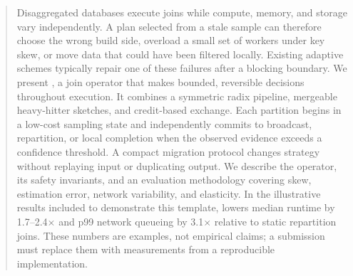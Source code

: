 \begin{abstract}
Disaggregated databases execute joins while compute, memory, and storage vary
independently.  A plan selected from a stale sample can therefore choose the
wrong build side, overload a small set of workers under key skew, or move data
that could have been filtered locally.  Existing adaptive schemes typically
repair one of these failures after a blocking boundary.  We present
\system{}, a join operator that makes bounded, reversible decisions throughout
execution.  It combines a symmetric radix pipeline, mergeable heavy-hitter
sketches, and credit-based exchange.  Each partition begins in a low-cost
sampling state and independently commits to broadcast, repartition, or local
completion when the observed evidence exceeds a confidence threshold.  A
compact migration protocol changes strategy without replaying input or
duplicating output.  We describe the operator, its safety invariants, and an
evaluation methodology covering skew, estimation error, network variability,
and elasticity.  In the illustrative results included to demonstrate this
template, \system{} lowers median runtime by 1.7--2.4$\times$ and p99 network
queueing by 3.1$\times$ relative to static repartition joins.  These numbers
are examples, not empirical claims; a submission must replace them with
measurements from a reproducible implementation.
\end{abstract}



